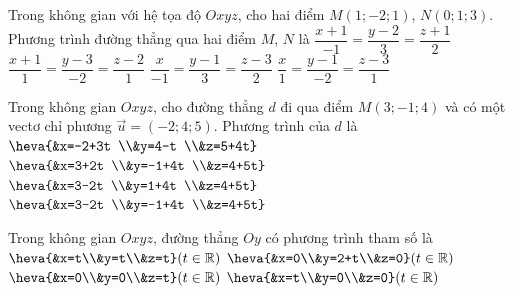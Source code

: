 \begin{ex}
	Trong không gian với hệ tọa độ $Oxyz$, cho hai điểm $M(1;-2; 1)$, $N(0; 1; 3)$. Phương trình đường thẳng qua hai điểm $M$, $N$ là
	\choice
	{$\dfrac{x+1}{-1}=\dfrac{y-2}{3}=\dfrac{z+1}{2}$}
	{$\dfrac{x+1}{1}=\dfrac{y-3}{-2}=\dfrac{z-2}{1}$}
	{\True $\dfrac{x}{-1}=\dfrac{y-1}{3}=\dfrac{z-3}{2}$}
	{$\dfrac{x}{1}=\dfrac{y-1}{-2}=\dfrac{z-3}{1}$}
\end{ex}
\begin{ex}Trong không gian $Oxyz$, cho đường thẳng $d$ đi qua điểm $M(3;-1; 4)$ và có một vectơ chỉ phương $\overrightarrow{u}=(-2; 4; 5)$. Phương trình của $d$ là
	\choice
	{$\heva{&x=-2+3t \\&y=4-t \\&z=5+4t}$}
	{$\heva{&x=3+2t \\&y=-1+4t \\&z=4+5t}$}
	{$\heva{&x=3-2t \\&y=1+4t \\&z=4+5t}$}
	{\True $\heva{&x=3-2t \\&y=-1+4t \\&z=4+5t}$}
\end{ex}
\begin{ex}
	Trong không gian $Oxyz$, đường thẳng $Oy$ có phương trình tham số là
	\choice
	{$\heva{&x=t\\&y=t\\&z=t}(t\in \mathbb{R})$}
	{\True $\heva{&x=0\\&y=2+t\\&z=0}(t\in \mathbb{R})$}
	{$\heva{&x=0\\&y=0\\&z=t}(t\in \mathbb{R})$}
	{$\heva{&x=t\\&y=0\\&z=0}(t\in \mathbb{R})$}
\end{ex}
